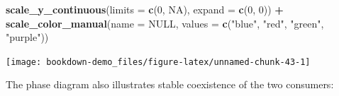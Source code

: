 \documentclass[
]{book}
\newenvironment{Shaded}{\begin{snugshade}}{\end{snugshade}}
\newcommand{\AttributeTok}[1]{\textcolor[rgb]{0.13,0.29,0.53}{#1}}
\newcommand{\ConstantTok}[1]{\textcolor[rgb]{0.56,0.35,0.01}{#1}}
\newcommand{\DecValTok}[1]{\textcolor[rgb]{0.00,0.00,0.81}{#1}}
\newcommand{\FunctionTok}[1]{\textcolor[rgb]{0.13,0.29,0.53}{\textbf{#1}}}
\newcommand{\NormalTok}[1]{#1}
\newcommand{\SpecialCharTok}[1]{\textcolor[rgb]{0.81,0.36,0.00}{\textbf{#1}}}
\newcommand{\StringTok}[1]{\textcolor[rgb]{0.31,0.60,0.02}{#1}}
\begin{document}
\begin{Shaded}
\begin{Highlighting}[]
  \FunctionTok{scale\_y\_continuous}\NormalTok{(}\AttributeTok{limits =} \FunctionTok{c}\NormalTok{(}\DecValTok{0}\NormalTok{, }\ConstantTok{NA}\NormalTok{), }\AttributeTok{expand =} \FunctionTok{c}\NormalTok{(}\DecValTok{0}\NormalTok{, }\DecValTok{0}\NormalTok{)) }\SpecialCharTok{+}
  \FunctionTok{scale\_color\_manual}\NormalTok{(}\AttributeTok{name =} \ConstantTok{NULL}\NormalTok{, }\AttributeTok{values =} \FunctionTok{c}\NormalTok{(}\StringTok{"blue"}\NormalTok{, }\StringTok{"red"}\NormalTok{, }\StringTok{"green"}\NormalTok{, }\StringTok{"purple"}\NormalTok{))}
\end{Highlighting}
\end{Shaded}

\begin{center}\texttt{[image: bookdown-demo\_files/figure-latex/unnamed-chunk-43-1]} \end{center}

The phase diagram also illustrates stable coexistence of the two consumers:
\end{document}
